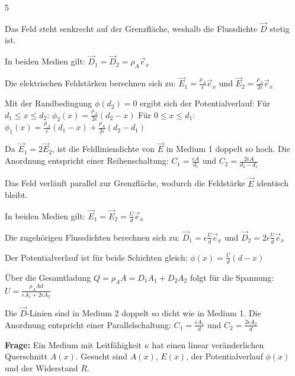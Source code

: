 \documentclass[a4paper, 2pt, landscape]{extarticle}
\begin{document}
\begin{multicols*}{5}
\begin{tcolorbox}[title={Geschichtete Medien I (Reihe) Dielektrikum ist nacheinander}, colback=white, colframe=boxtitle]
Das Feld steht senkrecht auf der Grenzfläche, weshalb die Flussdichte $\vec{D}$ stetig ist. 

In beiden Medien gilt: $\vec{D}_1 = \vec{D}_2 = \rho_A \vec{e}_x$

Die elektrischen Feldstärken berechnen sich zu: 
$\vec{E}_1 = \frac{\rho_A}{\epsilon} \vec{e}_x$ \quad und \quad $\vec{E}_2 = \frac{\rho_A}{2\epsilon} \vec{e}_x$

Mit der Randbedingung $\phi(d_2) = 0$ ergibt sich der Potentialverlauf:
Für $d_1 \le x \le d_2$: \quad $\phi_2(x) = \frac{\rho_A}{2\epsilon} (d_2 - x)$
Für $0 \le x \le d_1$: \quad $\phi_1(x) = \frac{\rho_A}{\epsilon} (d_1 - x) + \frac{\rho_A}{2\epsilon} (d_2 - d_1)$

Da $\vec{E}_1 = 2\vec{E}_2$, ist die Feldliniendichte von $\vec{E}$ in Medium 1 doppelt so hoch. 
Die Anordnung entspricht einer Reihenschaltung: $C_1 = \frac{\epsilon A}{d_1}$ und $C_2 = \frac{2\epsilon A}{d_2 - d_1}$
\end{tcolorbox}

\begin{tcolorbox}[title={Lösung Aufgabe 4: Geschichtete Medien II (Parallel) Dielektrikum ist übereinander}, colback=white, colframe=boxtitle]
Das Feld verläuft parallel zur Grenzfläche, wodurch die Feldstärke $\vec{E}$ identisch bleibt.

In beiden Medien gilt: $\vec{E}_1 = \vec{E}_2 = \frac{U}{d} \vec{e}_x$

Die zugehörigen Flussdichten berechnen sich zu:
$\vec{D}_1 = \epsilon \frac{U}{d} \vec{e}_x$ \quad und \quad $\vec{D}_2 = 2\epsilon \frac{U}{d} \vec{e}_x$

Der Potentialverlauf ist für beide Schichten gleich: $\phi(x) = \frac{U}{d} (d - x)$

Über die Gesamtladung $Q = \rho_A A = D_1 A_1 + D_2 A_2$ folgt für die Spannung:
$U = \frac{\rho_A A d}{\epsilon A_1 + 2\epsilon A_2}$

Die $\vec{D}$-Linien sind in Medium 2 doppelt so dicht wie in Medium 1. 
Die Anordnung entspricht einer Parallelschaltung: $C_1 = \frac{\epsilon A_1}{d}$ und $C_2 = \frac{2\epsilon A_2}{d}$
\end{tcolorbox}

\begin{tcolorbox}[title={Aufgabe 2: Strömungsfeld Kegel (Blatt 5)}]
\textbf{Frage:} Ein Medium mit Leitfähigkeit $\kappa$ hat einen linear veränderlichen Querschnitt $A(x)$. Gesucht sind $A(x)$, $E(x)$, der Potentialverlauf $\phi(x)$ und der Widerstand $R$.


\end{tcolorbox}
\end{multicols*}
\end{document}
